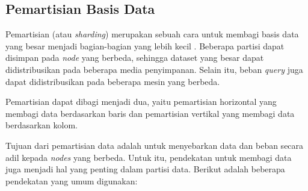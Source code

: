 \subsection{Pemartisian Basis Data}

Pemartisian (atau \textit{sharding}) merupakan sebuah cara untuk membagi basis data yang besar menjadi bagian-bagian yang lebih kecil \parencite{dataIntensiveApplications}. Beberapa partisi dapat disimpan pada \textit{node} yang berbeda, sehingga dataset yang besar dapat didistribusikan pada beberapa media penyimpanan. Selain itu, beban \textit{query} juga dapat didistribusikan pada beberapa mesin yang berbeda.

Pemartisian dapat dibagi menjadi dua, yaitu pemartisian horizontal yang membagi data berdasarkan baris dan pemartisian vertikal yang membagi data berdasarkan kolom.

Tujuan dari pemartisian data adalah untuk menyebarkan data dan beban secara adil kepada \textit{nodes} yang berbeda. Untuk itu, pendekatan untuk membagi data juga menjadi hal yang penting dalam partisi data. Berikut adalah beberapa pendekatan yang umum digunakan:

